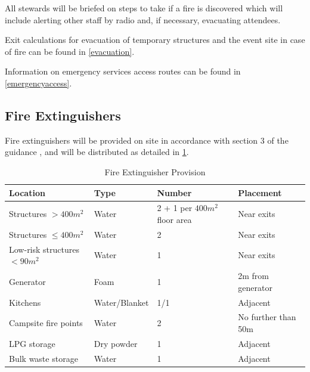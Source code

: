 All stewards will be briefed on steps to take if a fire is discovered which
will include alerting other staff by radio and, if necessary, evacuating
attendees.

Exit calculations for evacuation of temporary structures and the event site in case of
fire can be found in \cref{evacuation}.

Information on emergency services access routes can be found in \cref{emergencyaccess}.

\subsection{Fire Extinguishers}
\label{fire-extinguishers}

Fire extinguishers will be provided on site in accordance with section 3 of the
guidance \cite{firesafety}, and will be distributed as detailed in \cref{table:fireex}.

\begin{table}[h!]
    \caption{Fire Extinguisher Provision}
    \label{table:fireex}
    \centering
    \begin{tabular}{| l | l | l | l |}
        \hline
        \textbf{Location}            & \textbf{Type} & \textbf{Number}               & \textbf{Placement}  \\
        \hline
        Structures $>400m^2$         & Water         & 2 + 1 per $400m^2$ floor area & Near exits          \\
        Structures $\leq400m^2$      & Water         & 2                             & Near exits          \\
        Low-risk structures $<90m^2$ & Water         & 1                             & Near exits          \\
        Generator                    & Foam          & 1                             & 2m from generator   \\
        Kitchens                     & Water/Blanket & 1/1                           & Adjacent            \\
        Campsite fire points         & Water         & 2                             & No further than 50m \\
        LPG storage                  & Dry powder    & 1                             & Adjacent            \\
        Bulk waste storage           & Water         & 1                             & Adjacent            \\
        \hline
    \end{tabular}
\end{table}

